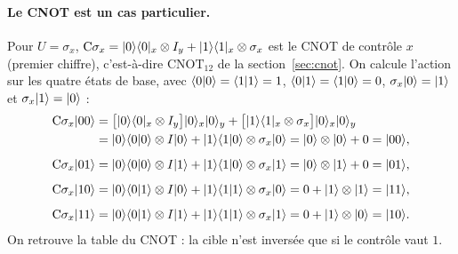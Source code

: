 \paragraph{Le CNOT est un cas particulier.} Pour $U=\sigma_x$,
$\mathrm{C}\sigma_x=|0\rangle\langle 0|_x\otimes I_y+|1\rangle\langle 1|_x\otimes\sigma_x$ est le CNOT de
contrôle $x$ (premier chiffre), c'est-à-dire $\mathrm{CNOT}_{12}$ de la section~\ref{sec:cnot}.
On calcule l'action sur les quatre états de base, avec $\langle 0|0\rangle=\langle 1|1\rangle=1$,
$\langle 0|1\rangle=\langle 1|0\rangle=0$, $\sigma_x|0\rangle=|1\rangle$ et $\sigma_x|1\rangle=|0\rangle$ :
\begin{align*}
  \mathrm{C}\sigma_x|00\rangle&=\big[|0\rangle\langle 0|_x\otimes I_y\big]|0\rangle_x|0\rangle_y
      +\big[|1\rangle\langle 1|_x\otimes\sigma_x\big]|0\rangle_x|0\rangle_y\\
    &=|0\rangle\langle 0|0\rangle\otimes I|0\rangle+|1\rangle\langle 1|0\rangle\otimes\sigma_x|0\rangle
     =|0\rangle\otimes|0\rangle+0=|00\rangle,\\[1.2ex]
  \mathrm{C}\sigma_x|01\rangle&=|0\rangle\langle 0|0\rangle\otimes I|1\rangle+|1\rangle\langle 1|0\rangle\otimes\sigma_x|1\rangle
     =|0\rangle\otimes|1\rangle+0=|01\rangle,\\[1.2ex]
  \mathrm{C}\sigma_x|10\rangle&=|0\rangle\langle 0|1\rangle\otimes I|0\rangle+|1\rangle\langle 1|1\rangle\otimes\sigma_x|0\rangle
     =0+|1\rangle\otimes|1\rangle=|11\rangle,\\[1.2ex]
  \mathrm{C}\sigma_x|11\rangle&=|0\rangle\langle 0|1\rangle\otimes I|1\rangle+|1\rangle\langle 1|1\rangle\otimes\sigma_x|1\rangle
     =0+|1\rangle\otimes|0\rangle=|10\rangle.
\end{align*}
On retrouve la table du CNOT : la cible n'est inversée que si le contrôle vaut $1$.

